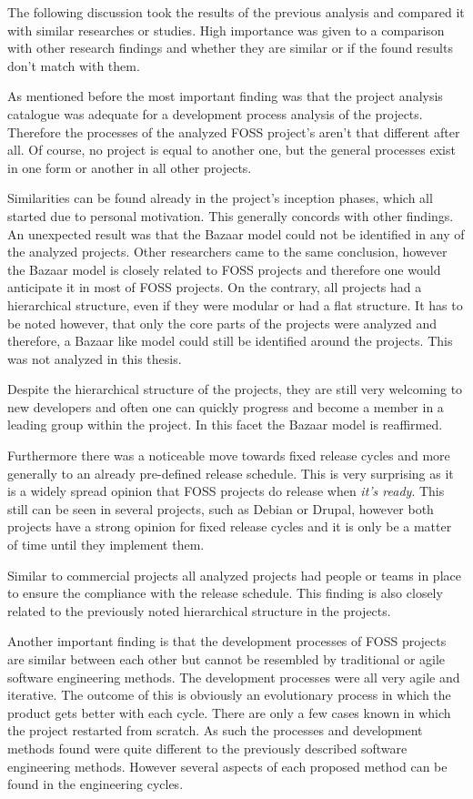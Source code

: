 The following discussion took the results of the previous analysis and compared
it with similar researches or studies. High importance was given to a
comparison with other research findings and whether they are similar or if the
found results don't match with them.

As mentioned before the most important finding was that the project analysis
catalogue was adequate for a development process analysis of the projects.
Therefore the processes of the analyzed \ac{FOSS} project's aren't that
different after all. Of course, no project is equal to another one, but the
general processes exist in one form or another in all other projects.

Similarities can be found already in the project's inception phases, which all
started due to personal motivation. This generally concords with other
findings. An unexpected result was that the Bazaar model could not be
identified in any of the analyzed projects. Other researchers came to the same
conclusion, however the Bazaar model is closely related to \ac{FOSS} projects
and therefore one would anticipate it in most of \ac{FOSS} projects. On the
contrary, all projects had a hierarchical structure, even if they were modular
or had a flat structure. It has to be noted however, that only the core parts
of the projects were analyzed and therefore, a Bazaar like model could still be
identified around the projects. This was not analyzed in this thesis.

Despite the hierarchical structure of the projects, they are still very
welcoming to new developers and often one can quickly progress and become a
member in a leading group within the project. In this facet the Bazaar model is
reaffirmed.

Furthermore there was a noticeable move towards fixed release cycles and more
generally to an already pre-defined release schedule. This is very surprising
as it is a widely spread opinion that \ac{FOSS} projects do release when
\emph{it's ready}. This still can be seen in several projects, such as Debian
or Drupal, however both projects have a strong opinion for fixed release cycles
and it is only be a matter of time until they implement them.

Similar to commercial projects all analyzed projects had people or teams in
place to ensure the compliance with the release schedule. This finding is also
closely related to the previously noted hierarchical structure in the projects.

Another important finding is that the development processes of \ac{FOSS}
projects are similar between each other but cannot be resembled by traditional
or agile software engineering methods. The development processes were all very
agile and iterative. The outcome of this is obviously an evolutionary process
in which the product gets better with each cycle. There are only a few cases
known in which the project restarted from scratch. As such the processes and
development methods found were quite different to the previously described
software engineering methods. However several aspects of each proposed method
can be found in the engineering cycles.

